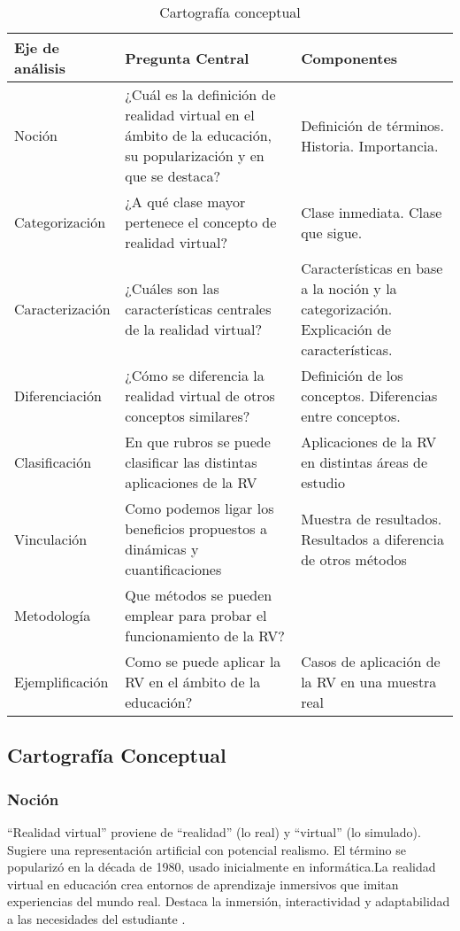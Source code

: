 \begin{table}[!h]
   \caption{Cartografía conceptual}
   \begin{tabular}{p{3.5cm}|p{4.5cm}|p{4.2cm}}
      Eje de análisis & Pregunta Central & Componentes\\
      \hline
      Noción & ¿Cuál es la definición de realidad virtual en el ámbito de la educación, su popularización y en que se destaca? & Definición de términos. Historia. Importancia.\\
      Categorización & ¿A qué clase mayor pertenece el concepto de realidad virtual? & Clase inmediata. Clase que sigue.\\
      Caracterización & ¿Cuáles son las características centrales de la realidad virtual? & Características en base a la noción y la categorización. Explicación de características.\\
      Diferenciación & ¿Cómo se diferencia la realidad virtual de otros conceptos similares? & Definición de los conceptos. Diferencias entre conceptos.\\
      Clasificación & En que rubros se puede clasificar las distintas aplicaciones de la RV & Aplicaciones de la RV en distintas áreas de estudio\\
      Vinculación & Como podemos ligar los beneficios propuestos a dinámicas y cuantificaciones& Muestra de resultados. Resultados a diferencia de otros métodos\\
      Metodología & Que métodos se pueden emplear para probar el funcionamiento de la RV?&\\
      Ejemplificación & Como se puede aplicar la RV en el ámbito de la educación? & Casos de aplicación de la RV en una muestra real\\
   \end{tabular}
\end{table}

\subsection{Cartografía Conceptual}

\subsubsection{Noción}

“Realidad virtual” proviene de “realidad” (lo real) y “virtual” (lo simulado). Sugiere una representación artificial con potencial realismo. El término se popularizó en la década de 1980, usado inicialmente en informática.La realidad virtual en educación crea entornos de aprendizaje inmersivos que imitan experiencias del mundo real. Destaca la inmersión, interactividad y adaptabilidad a las necesidades del estudiante \parencite{zheng1998virtual}.

